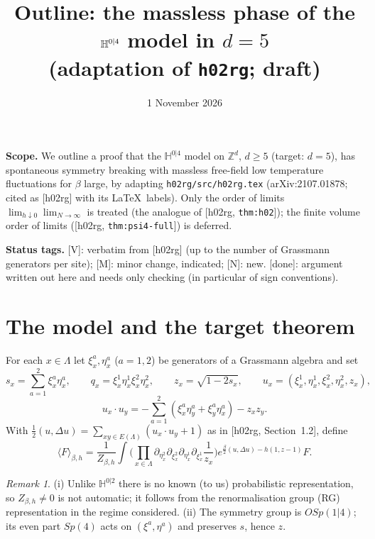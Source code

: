 \documentclass[11pt]{article}
\title{Outline: the massless phase of the $\HH^{0|4}$ model in $d=5$\\[2pt]
\large (adaptation of \texttt{h02rg}; draft)}
\date{1 November 2026}
\theoremstyle{remark}
\newtheorem{remark}[theorem]{Remark}
\theoremstyle{definition}
\newcommand{\HH}{\mathbb{H}}
\newcommand{\Z}{\mathbb{Z}}
\newcommand{\avg}[1]{\langle #1\rangle}
\newcommand{\st}[1]{\textsf{[#1]}}
\newcommand{\hr}[1]{\textup{[h02rg, \texttt{#1}]}}
\begin{document}
\maketitle

\noindent
\textbf{Scope.} We outline a proof that the $\HH^{0|4}$ model on $\Z^d$, $d\ge 5$ (target: $d=5$),
has spontaneous symmetry breaking with massless free-field low temperature fluctuations for $\beta$ large,
by adapting \texttt{h02rg/src/h02rg.tex} (arXiv:2107.01878; cited as [h02rg] with its \LaTeX\ labels).
Only the order of limits $\lim_{h\downarrow0}\lim_{N\to\infty}$ is treated (the analogue of \hr{thm:h02});
the finite volume order of limits (\hr{thm:psi4-full}) is deferred.

\medskip
\noindent\textbf{Status tags.}
\st{V}: verbatim from [h02rg] (up to the number of Grassmann generators per site);
\st{M}: minor change, indicated;
\st{N}: new.
\st{done}: argument written out here and needs only checking (in particular of sign conventions).

\tableofcontents

\section{The model and the target theorem}

For each $x\in\Lambda$ let $\xi^a_x,\eta^a_x$ ($a=1,2$) be generators of a Grassmann algebra and set
\begin{equation}
  s_x=\sum_{a=1}^2\xi^a_x\eta^a_x,\qquad q_x=\xi^1_x\eta^1_x\xi^2_x\eta^2_x,\qquad
  z_x=\sqrt{1-2s_x},\qquad u_x=(\xi^1_x,\eta^1_x,\xi^2_x,\eta^2_x,z_x),
\end{equation}
\begin{equation}
  u_x\cdot u_y=-\sum_{a=1}^2(\xi^a_x\eta^a_y+\xi^a_y\eta^a_x)-z_xz_y .
\end{equation}
With $\frac12(u,\Delta u)=\sum_{xy\in E(\Lambda)}(u_x\cdot u_y+1)$ as in [h02rg, Section~1.2], define
\begin{equation}\label{e:h04-def}
  \avg{F}_{\beta,h}=\frac{1}{Z_{\beta,h}}\int\Big(\prod_{x\in\Lambda}\partial_{\eta^2_x}\partial_{\xi^2_x}\partial_{\eta^1_x}\partial_{\xi^1_x}\frac1{z_x}\Big)
  e^{\frac\beta2(u,\Delta u)-h(1,z-1)}F .
\end{equation}

\begin{remark}
(i) Unlike $\HH^{0|2}$ there is no known (to us) probabilistic representation, so $Z_{\beta,h}\neq0$ is not automatic;
it follows from the renormalisation group (RG) representation in the regime considered.
(ii) The symmetry group is $OSp(1|4)$; its even part $Sp(4)$ acts on $(\xi^a,\eta^a)$ and preserves $s$, hence $z$.
\end{remark}
\end{document}
